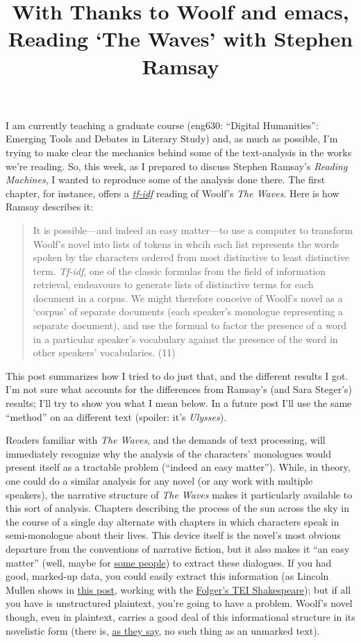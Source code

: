\documentclass[
  12pt,
]{article}
\title{With Thanks to Woolf and emacs, Reading `The Waves' with Stephen
Ramsay}
\author{}
\date{}
\begin{document}
I am currently teaching a graduate course (eng630: ``Digital
Humanities'': Emerging Tools and Debates in Literary Study) and, as much
as possible, I'm trying to make clear the mechanics behind some of the
text-analysis in the works we're reading. So, this week, as I prepared
to discuss Stephen Ramsay's \emph{Reading Machines}, I wanted to
reproduce some of the analysis done there. The first chapter, for
instance, offers a
\emph{\href{http://en.wikipedia.org/wiki/Tf\%E2\%80\%93idf}{tf-idf}}
reading of Woolf's \emph{The Waves}. Here is how Ramsay describes it:

\begin{quote}
It is possible---and indeed an easy matter---to use a computer to
transform Woolf's novel into lists of tokens in whcih each list
represents the words spoken by the characters ordered from most
distinctive to least distinctive term. \emph{Tf-idf}, one of the classic
formulas from the field of information retrieval, endeavours to generate
lists of distinctive terms for each document in a corpus. We might
therefore conceive of Woolf's novel as a `corpus' of separate documents
(each speaker's monologue representing a separate document), and use the
formual to factor the presence of a word in a particular speaker's
vocabulary against the presence of the word in other speakers'
vocabularies. (11)
\end{quote}

This post summarizes how I tried to do just that, and the different
results I got. I'm not sure what accounts for the differences from
Ramsay's (and Sara Steger's) results; I'll try to show you what I mean
below. In a future post I'll use the same ``method'' on aa different
text (spoiler: it's \emph{Ulysses}).

Readers familiar with \emph{The Waves}, and the demands of text
processing, will immediately recognize why the analysis of the
characters' monologues would present itself as a tractable problem
(``indeed an easy matter''). While, in theory, one could do a similar
analysis for any novel (or any work with multiple speakers), the
narrative structure of \emph{The Waves} makes it particularly available
to this sort of analysis. Chapters describing the process of the sun
across the sky in the course of a single day alternate with chapters in
which characters speak in semi-monologue about their lives. This device
itself is the novel's most obvious departure from the conventions of
narrative fiction, but it also makes it ``an easy matter'' (well, maybe
for \href{http://xkcd.com/208/}{some people}) to extract these
dialogues. If you had good, marked-up data, you could easily extract
this information (as Lincoln Mullen shows in
\href{http://lincolnmullen.com/blog/parsing-tei-files-in-ruby-with-nokogiri/}{this
post}, working with the
\href{http://www.folgerdigitaltexts.org/}{Folger's TEI Shakespeare});
but if all you have is unstructured plaintext, you're going to have a
problem. Woolf's novel though, even in plaintext, carries a good deal of
this informational structure in its novelistic form (there is,
\href{http://books.google.com/books?id=eCfinn-Ye00C}{as they say}, no
such thing as an unmarked text).
\end{document}
